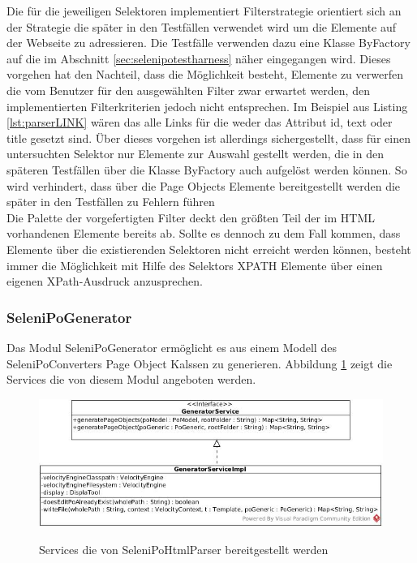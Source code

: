 Die für die jeweiligen Selektoren implementiert Filterstrategie orientiert sich an der Strategie die später in den Testfällen verwendet wird um die Elemente auf der Webseite zu adressieren. Die Testfälle verwenden dazu eine Klasse ByFactory auf die im Abschnitt \ref{sec:selenipotestharness} näher eingegangen wird.
Dieses vorgehen hat den Nachteil, dass die Möglichkeit besteht, Elemente zu verwerfen die vom Benutzer für den ausgewählten Filter zwar erwartet werden, den implementierten Filterkriterien jedoch nicht entsprechen.
Im Beispiel aus Listing \ref{lst:parserLINK} wären das alle Links für die weder das Attribut id, text oder title gesetzt sind.
Über dieses vorgehen ist allerdings sichergestellt, dass für einen untersuchten Selektor nur Elemente zur Auswahl gestellt werden, die in den späteren Testfällen über die Klasse ByFactory auch aufgelöst werden können. So wird verhindert, dass über die Page Objects Elemente bereitgestellt werden die später in den Testfällen zu Fehlern führen\\
Die Palette der vorgefertigten Filter deckt den größten Teil der im HTML vorhandenen Elemente bereits ab. Sollte es dennoch zu dem Fall kommen, dass Elemente über die existierenden Selektoren nicht erreicht werden können, besteht immer die Möglichkeit mit Hilfe des Selektors XPATH Elemente über einen eigenen XPath-Ausdruck anzusprechen.



\subsubsection{SeleniPoGenerator}
\label{sec:selenipogenerator}
Das Modul SeleniPoGenerator ermöglicht es aus einem Modell des SeleniPoConverters Page Object Kalssen zu generieren.
Abbildung \ref{fig:generator_service} zeigt die Services die von diesem Modul angeboten werden.

\begin{figure}[htb]
  \centering  
  \includegraphics[scale=0.5]{img/SelenipoGenerator.jpg}\\
  \caption{Services die von SeleniPoHtmlParser bereitgestellt werden}
  \label{fig:generator_service}
\end{figure}

